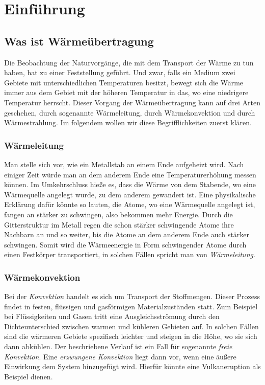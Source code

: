 \chapter{Einführung}
\label{cha:1}

\section{Was ist Wärmeübertragung}

Die Beobachtung der Naturvorgänge, die mit dem Transport der Wärme zu tun haben, hat zu einer Feststellung geführt. Und zwar, falls ein Medium zwei Gebiete mit unterschiedlichen Temperaturen besitzt, bewegt sich die Wärme immer aus dem Gebiet mit der höheren Temperatur in das, wo eine niedrigere Temperatur herrscht. Dieser Vorgang der Wärmeübertragung kann auf drei Arten geschehen, durch sogenannte Wärmeleitung, durch Wärmekonvektion und durch Wärmestrahlung. Im folgendem wollen wir diese Begrifflichkeiten zuerst klären.

\subsection{Wärmeleitung}

Man stelle sich vor, wie ein Metallstab an einem Ende aufgeheizt wird. Nach einiger Zeit würde man an dem anderem Ende eine Temperaturerhöhung messen können. Im Umkehrschluss hieße es, dass die Wärme von dem Stabende, wo eine Wärmequelle angelegt wurde, zu dem anderem gewandert ist. Eine physikalische Erklärung dafür könnte so lauten, die Atome, wo eine Wärmequelle angelegt ist, fangen an stärker zu schwingen, also bekommen mehr Energie. Durch die Gitterstruktur im Metall regen die schon stärker schwingende Atome ihre Nachbarn an und so weiter, bis die Atome an dem anderem Ende auch stärker schwingen. Somit wird die Wärmeenergie in Form schwingender Atome durch einen Festkörper transportiert, in solchen Fällen spricht man von \textit{Wärmeleitung}.

\subsection{Wärmekonvektion}

Bei der \textit{Konvektion} handelt es sich um Transport der Stoffmengen. Dieser Prozess findet in festen, flüssigen und gasförmigen Materialzuständen statt. Zum Beispiel bei Flüssigkeiten und Gasen tritt eine Ausgleichsströmung durch den Dichteunterschied zwischen warmen und kühleren Gebieten auf. In solchen Fällen sind die wärmeren Gebiete spezifisch leichter und steigen in die Höhe, wo sie sich dann abkühlen. Der beschriebene Verlauf ist ein Fall für sogenannte \textit{freie Konvektion}. Eine \textit{erzwungene Konvektion} liegt dann vor, wenn eine äußere Einwirkung dem System hinzugefügt wird. Hierfür könnte eine Vulkaneruption als Beispiel dienen. 

